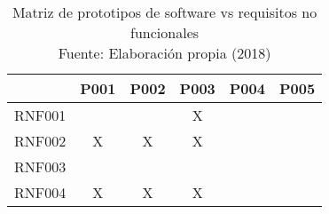 
\begin{table}[]
\centering
\captionsetup{justification=centering}
\caption[Matriz de prototipos de software vs requisitos no funcionales]{Matriz de prototipos de software vs requisitos no funcionales \\ Fuente: Elaboración propia (2018)}
\label{table:RNF-summary}
\begin{tabular}{|c|c|c|c|c|c|}
\hline
 & P001 & P002 & P003 & P004 & P005 \\ \hline
RNF001 &  &  & X &  &  \\ \hline
RNF002 & X & X & X &  &  \\ \hline
RNF003 &  &  &  &  &  \\ \hline
RNF004 & X & X & X &  &  \\ \hline
\end{tabular}
\end{table}